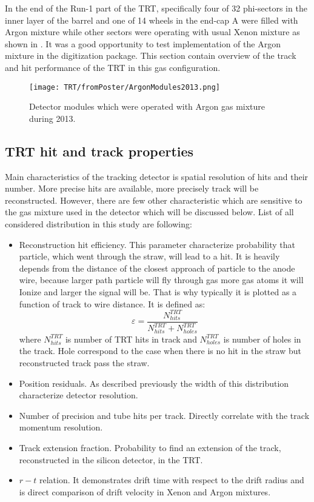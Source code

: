 In the end of the Run-1 part of the TRT, specifically
four of 32 phi-sectors in the inner layer of the barrel and one of 14 wheels in the end-cap A were filled with Argon mixture while other sectors were operating 
with usual Xenon mixture as shown in .
It was a good opportunity to test implementation of the Argon mixture in the digitization package.
This section contain overview of the track and hit performance of the TRT in this gas configuration.

\begin{figure}
\begin{center}
 \texttt{[image: TRT/fromPoster/ArgonModules2013.png]}
\caption{Detector modules which were operated with Argon gas mixture during 2013.}
\label{fig:argonModulesIn2013}
\end{center}
\end{figure}

\subsection{TRT hit and track properties}

Main characteristics of the tracking detector is spatial resolution of hits and their number. 
More precise hits are available, more precisely track will be reconstructed.
However, there are few other characteristic which are sensitive to the gas mixture used in the detector which will be discussed below.
List of all considered distribution in this study are following:
\begin{itemize}
 \item Reconstruction hit efficiency. This parameter characterize probability that particle, which went through the straw, will lead to a hit.
 It is heavily depends from the distance of the closest approach of particle to the anode wire, because larger path particle will fly through gas more gas atoms it will
 Ionize and larger the signal will be. That is why typically it is plotted as a function of track to wire distance. It is defined as:
 \begin{equation}
  \varepsilon = \dfrac{N^{TRT}_{hits}}{N^{TRT}_{hits} + N^{TRT}_{holes}}
 \label{eq:hit_eff}
 \end{equation}
 where $N^{TRT}_{hits}$ is number of TRT hits in track and $N^{TRT}_{holes}$ is number of holes in the track. Hole correspond to the case when there is no hit in the straw
 but reconstructed track pass the straw.
 \item Position residuals. As described previously the width of this distribution characterize detector resolution.
 \item Number of precision and tube hits per track. Directly correlate with the track momentum resolution.
 \item Track extension fraction. Probability to find an extension of the track, reconstructed in the silicon detector, in the TRT.
 \item $r-t$ relation. It demonstrates drift time with respect to the drift radius and is direct comparison of drift velocity in Xenon and Argon mixtures.
\end{itemize}


